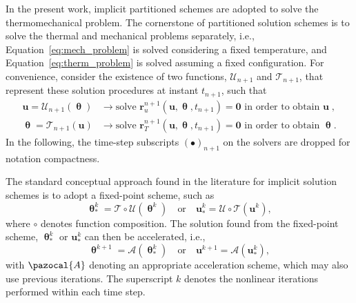 In the present work, implicit partitioned schemes are adopted to solve the thermomechanical problem.
The cornerstone of partitioned solution schemes is to solve the thermal and mechanical problems separately, i.e., Equation~\eqref{eq:mech_problem} is solved considering a fixed temperature, and Equation~\eqref{eq:therm_problem} is solved assuming a fixed configuration.
For convenience, consider the existence of two functions, \(\bm{\mathcal{U}}_{n+1}\) and \(\bm{\mathcal{T}}_{n+1}\), that represent these solution procedures at instant \(t_{n+1}\), such that
\begin{align}
  \mathbf{u} = \bm{\mathcal{U}}_{n+1}(\bm{\uptheta}) & \rightarrow \text{solve } \mathbf{r}_{u}^{n+1}(\mathbf{u}, \bm{\uptheta}, t_{n+1})=\bm{0} \text{ in order to obtain } \mathbf{u}\;, \label{eq:def_solvers_u} \\
  \bm{\uptheta} = \bm{\mathcal{T}}_{n+1}(\mathbf{u}) & \rightarrow \text{solve } \mathbf{r}_{T}^{n+1}(\mathbf{u}, \bm{\uptheta}, t_{n+1})=\bm{0} \text{ in order to obtain } \bm{\uptheta}. \label{eq:def_solvers_t}
\end{align}
In the following, the time-step subscripts $(\bullet)_{n+1}$ on the solvers are dropped for notation compactness.

The standard conceptual approach found in the literature for implicit solution schemes is to adopt a fixed-point scheme, such as
\begin{equation}
  \bm{\uptheta}^{k}_* = \bm{\mathcal{T}} \circ \bm{\mathcal{U}}(\bm{\uptheta}^k) \quad \text{or} \quad \mathbf{u}^{k}_* = \bm{\mathcal{U}} \circ \bm{\mathcal{T}}(\mathbf{u}^k),
\end{equation}
where \(\circ\) denotes function composition.
The solution found from the fixed-point scheme, \(\bm{\uptheta}^{k}_*\) or \(\mathbf{u}^{k}_*\) can then be accelerated, i.e.,
\begin{equation}
  \bm{\uptheta}^{k+1} = \bm{\mathcal{A}}(\bm{\uptheta}^{k}_*) \quad \text{or} \quad \mathbf{u}^{k+1} = \bm{\mathcal{A}}(\mathbf{u}^{k}_*),
\end{equation}
with \(\pazocal{A}\) denoting an appropriate acceleration scheme, which may also use previous iterations.
The superscript \(k\) denotes the nonlinear iterations performed within each time step.

